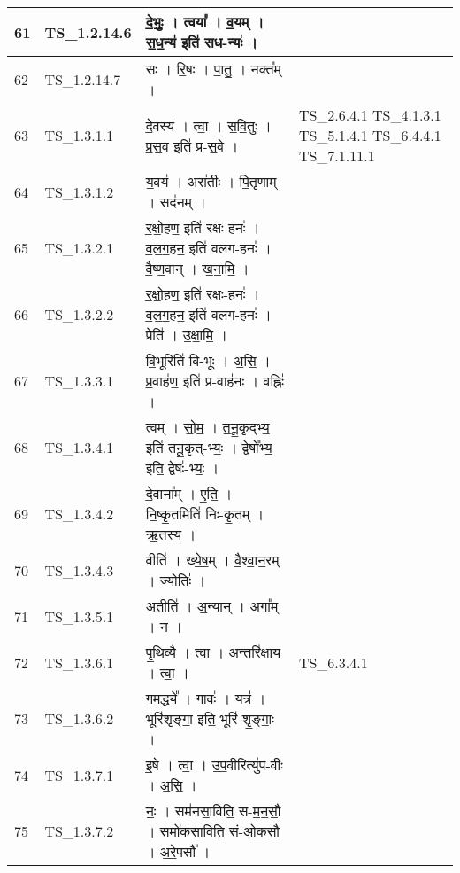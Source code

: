 \documentclass[17pt]{extarticle}
\begin{document}
\begin{longtable}{||p{0.4in}||p{0.9in}||p{4.0in}||p{0.9in}||}
        \hline
            61 & TS\_1.2.14.6 & दे॒भुः॒   ।   त्वया᳚   ।   व॒यम्   ।   स॒ध॒न्य॑ इति॑ सध{-}न्यः॑   ।    &      \\
        \hline
            62 & TS\_1.2.14.7 & सः   ।   रि॒षः   ।   पा॒तु॒   ।   नक्त᳚म्   ।    &      \\
        \hline
            63 & TS\_1.3.1.1 & दे॒वस्य॑   ।   त्वा॒   ।   स॒वि॒तुः   ।   प्र॒स॒व इति॑ प्र{-}स॒वे   ।    &  TS\_2.6.4.1 TS\_4.1.3.1 TS\_5.1.4.1 TS\_6.4.4.1 TS\_7.1.11.1       \\
        \hline
            64 & TS\_1.3.1.2 & य॒वय॑   ।   अरा॑तीः   ।   पि॒तृ॒णाम्   ।   सद॑नम्   ।    &      \\
        \hline
            65 & TS\_1.3.2.1 & र॒क्षो॒हण॒ इति॑ रक्षः{-}हनः॑   ।   व॒ल॒ग॒हन॒ इति॑ वलग{-}हनः॑   ।   वै॒ष्ण॒वान्   ।   ख॒ना॒मि॒   ।    &      \\
        \hline
            66 & TS\_1.3.2.2 & र॒क्षो॒हण॒ इति॑ रक्षः{-}हनः॑   ।   व॒ल॒ग॒हन॒ इति॑ वलग{-}हनः॑   ।   प्रेति॑   ।   उ॒क्षा॒मि॒   ।    &      \\
        \hline
            67 & TS\_1.3.3.1 & वि॒भूरिति॑ वि{-}भूः   ।   अ॒सि॒   ।   प्र॒वाह॑ण॒ इति॑ प्र{-}वाह॑नः   ।   वह्निः॑   ।    &      \\
        \hline
            68 & TS\_1.3.4.1 & त्वम्   ।   सो॒म॒   ।   त॒नू॒कृद्भ्य॒ इति॑ तनू॒कृत्{-}भ्यः॒   ।   द्वेषो᳚भ्य॒ इति॒ द्वेषः॑{-}भ्यः॒   ।    &      \\
        \hline
            69 & TS\_1.3.4.2 & दे॒वाना᳚म्   ।   ए॒ति॒   ।   नि॒ष्कृ॒तमिति॑ निः{-}कृ॒तम्   ।   ऋ॒तस्य॑   ।    &      \\
        \hline
            70 & TS\_1.3.4.3 & वीति॑   ।   ख्ये॒ष॒म्   ।   वै॒श्वा॒न॒रम्   ।   ज्योतिः॑   ।    &      \\
        \hline
            71 & TS\_1.3.5.1 & अतीति॑   ।   अ॒न्यान्   ।   अगा᳚म्   ।   न   ।    &      \\
        \hline
            72 & TS\_1.3.6.1 & पृ॒थि॒व्यै   ।   त्वा॒   ।   अ॒न्तरि॑क्षाय   ।   त्वा॒   ।    &  TS\_6.3.4.1       \\
        \hline
            73 & TS\_1.3.6.2 & ग॒मद्ध्ये᳚   ।   गावः॑   ।   यत्र॑   ।   भूरि॑शृङ्गा॒ इति॒ भूरि॑{-}शृ॒ङ्गाः॒   ।    &      \\
        \hline
            74 & TS\_1.3.7.1 & इ॒षे   ।   त्वा॒   ।   उ॒प॒वीरित्यु॑प{-}वीः   ।   अ॒सि॒   ।    &      \\
        \hline
            75 & TS\_1.3.7.2 & नः॒   ।   सम॑नसा॒विति॒ स{-}म॒न॒सौ॒   ।   समो॑कसा॒विति॒ सं{-}ओ॒क॒सौ॒   ।   अ॒रे॒पसौ᳚   ।    &      \\

\end{longtable}
\end{document}
